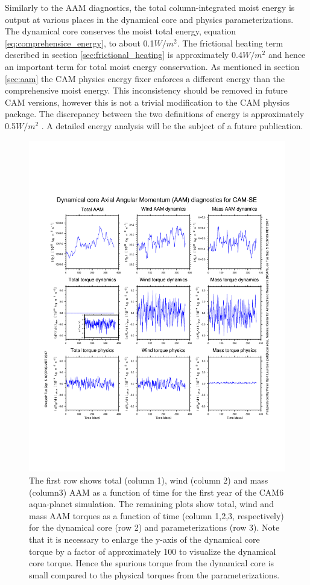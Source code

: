 \documentclass{agujournal}
\begin{document}
Similarly to the AAM diagnostics, the total column-integrated moist energy is output at various places in the dynamical core and physics parameterizations. The dynamical core conserves the moist total energy, equation \eqref{eq:comprehensice_energy}, to about 0.1$W/m^2$. The frictional heating term described in section \ref{sec:frictional_heating} is approximately 0.4$W/m^2$ and hence an important term for total moist energy conservation. As mentioned in section \ref{sec:aam} the CAM physics energy fixer enforces a different energy than the comprehensive moist energy. This inconsistency should be removed in future CAM versions, however this is not a trivial modification to the CAM physics package. The discrepancy between the two definitions of energy is approximately 0.5$W/m^2$ \citep[similar to what ][ found when just including the correct heat capacity for water vapor in the total energy equation]{T2011LNCSEb}. A detailed energy analysis will be the subject of a future publication.
%
\begin{figure}[h]
\centering
\includegraphics[width=30pc]{figs/aam.pdf}
\caption{The first row shows total (column 1), wind (column 2) and mass (column3) AAM as a function of time for the first year of the CAM6 aqua-planet simulation. The remaining plots show total, wind and mass AAM torques as a function of time (column 1,2,3, respectively) for the dynamical core (row 2) and parameterizations (row 3). Note that it is necessary to enlarge the y-axis of the dynamical core torque by a factor of approximately 100 to visualize the dynamical core torque. Hence the spurious torque from the dynamical core is small compared to the physical torques from the parameterizations.}
\label{fig:aam}
\end{figure}
\end{document}
